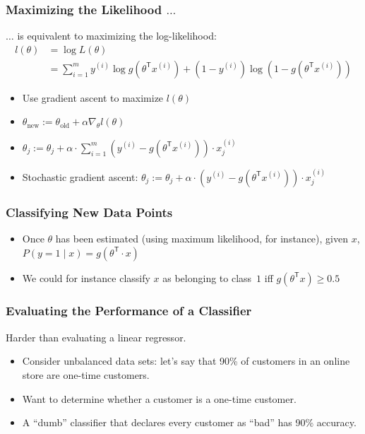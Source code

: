 \documentclass[xcolor=table]{beamer}
\newcommand{\trans}[1]{\ensuremath{#1}^{\scriptscriptstyle{\textsf{T}}}}
\begin{document}
\begin{frame}[t]
\frametitle{Maximizing the Likelihood $\ldots$}
$\ldots$ is equivalent to maximizing the log-likelihood:
\begin{equation*}
\begin{split}
l(\theta) & =  \log L(\theta) \\
          & = \sum_{i = 1}^{m} y^{(i)} \log g(\trans{\theta} x^{(i)}) 
          		+ (1 - y^{(i)}) \log(1 - g(\trans{\theta} x^{(i)}))
\end{split}
\end{equation*}

\begin{itemize}
	\item Use gradient ascent to maximize $l(\theta)$
	
	\item $\theta_{\text{new}} := \theta_{\text{old}} + \alpha \nabla_{\theta} l(\theta)$
	
	\item $\theta_j := \theta_j + \alpha \cdot \sum_{i = 1}^{m} \left ( y^{(i)} - 
					    g(\trans{\theta} x^{(i)}) \right ) \cdot x_j^{(i)}$
	\item Stochastic gradient ascent: $\theta_j := \theta_j + \alpha \cdot 
										(y^{(i)} - g(\trans{\theta} x^{(i)}) )\cdot x_j^{(i)}$
\end{itemize}
\end{frame}

\begin{frame}[t]
\frametitle{Classifying New Data Points}
\begin{itemize}
	\item Once $\theta$ has been estimated (using maximum likelihood, for instance),
			given $x$, $P(y = 1 \mid x) = g(\trans{\theta} \cdot x)$
	\item We could for instance classify $x$ as belonging to class~$1$ iff $g(\trans{\theta} x) \geq 0.5$
\end{itemize}
\end{frame}

\begin{frame}[t]
\frametitle{Evaluating the Performance of a Classifier}
Harder than evaluating a linear regressor.
\begin{itemize}
	\item Consider unbalanced data sets: let's say that 90\% of customers in an online store 
		are one-time customers.
	
	\item Want to determine whether a customer is a one-time customer.
	
	\item A ``dumb'' classifier that declares every customer as ``bad'' has 90\% accuracy.  
\end{itemize}
\end{frame}
\end{document}
